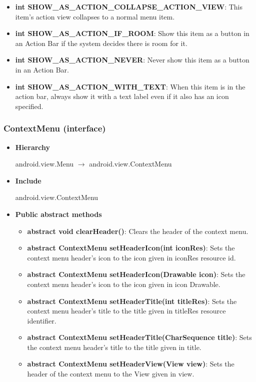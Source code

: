 \documentclass{report}
\begin{document}
\begin{itemize}
\begin{itemize}
\begin{itemize}
                \item \textbf{int	SHOW\_AS\_ACTION\_COLLAPSE\_ACTION\_VIEW}: This item's action view collapses to a normal menu item.
                \item \textbf{int	SHOW\_AS\_ACTION\_IF\_ROOM}: Show this item as a button in an Action Bar if the system decides there is room for it.
                \item \textbf{int	SHOW\_AS\_ACTION\_NEVER}: Never show this item as a button in an Action Bar.
                \item \textbf{int	SHOW\_AS\_ACTION\_WITH\_TEXT}: When this item is in the action bar, always show it with a text label even if it also has an icon specified.
            \end{itemize}
    \end{itemize}

    \pagebreak 
    \subsubsection{ContextMenu (interface)}
    \begin{itemize}
        \item \textbf{Hierarchy}
            \begin{center}
                android.view.Menu $\to$ android.view.ContextMenu
            \end{center}
        \item \textbf{Include}
            \bigbreak \noindent 
            \begin{javacode}
                android.view.ContextMenu 
            \end{javacode}
        \item \textbf{Public abstract methods}
            \begin{itemize}
                \item \textbf{abstract void	clearHeader()}: Clears the header of the context menu.
                \item \textbf{abstract ContextMenu	setHeaderIcon(int iconRes)}: Sets the context menu header's icon to the icon given in iconRes resource id.
                \item \textbf{abstract ContextMenu	setHeaderIcon(Drawable icon)}: Sets the context menu header's icon to the icon given in icon Drawable.
                \item \textbf{abstract ContextMenu	setHeaderTitle(int titleRes)}: Sets the context menu header's title to the title given in titleRes resource identifier.
                \item \textbf{abstract ContextMenu	setHeaderTitle(CharSequence title)}: Sets the context menu header's title to the title given in title.
                \item \textbf{abstract ContextMenu	setHeaderView(View view)}: Sets the header of the context menu to the View given in view.
            \end{itemize}
    \end{itemize}


\end{itemize}
\end{document}
